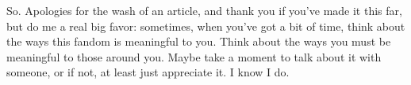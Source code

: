 So. Apologies for the wash of an article, and thank you if you've made it this far, but do me a real big favor: sometimes, when you've got a bit of time, think about the ways this fandom is meaningful to you. Think about the ways you must be meaningful to those around you. Maybe take a moment to talk about it with someone, or if not, at least just appreciate it. I know I do.
